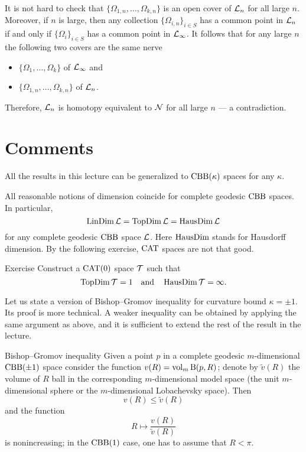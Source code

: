 It is not hard to check that $\{\Omega_{1,n},\dots,\Omega_{k,n}\}$ is an open cover of $\mathcal{L}_n$ for all large $n$.
Moreover, if $n$ is large, then any collection $\{\Omega_{i,n}\}_{i\in S}$ has a common point in $\mathcal{L}_n$ 
if and only if $\{\Omega_{i}\}_{i\in S}$ has a common point in $\mathcal{L}_\infty$.
It follows that for any large $n$ the following two covers are the same nerve
\begin{itemize}
\item $\{\Omega_{1},\dots,\Omega_{k}\}$ of $\mathcal{L}_\infty$ and 
\item $\{\Omega_{1,n},\dots,\Omega_{k,n}\}$ of $\mathcal{L}_n$.
\end{itemize}
Therefore, $\mathcal{L}_n$ is homotopy equivalent to $\mathcal{N}$ for all large $n$ --- a contradiction.
\qeds


\section{Comments}

All the results in this lecture can be generalized to $\mathrm{CBB}(\kappa)$ spaces for any $\kappa$.

All reasonable notions of dimension coincide for complete geodesic $\mathrm{CBB}$ spaces.
In particular,
\[\mathop{\rm LinDim}\nolimits \mathcal{L}=\mathop{\rm TopDim}\nolimits \mathcal{L}=\mathop{\rm HausDim}\nolimits \mathcal{L}\]
for any complete geodesic $\mathrm{CBB}$ space $\mathcal{L}$.
Here $\mathop{\rm HausDim}\nolimits$ stands for Hausdorff dimension.
By the following exercise, $\mathrm{CAT}$ spaces are not that good.

\begin{thm}{Exercise}
Construct a $\mathrm{CAT}(0)$ space $\mathcal{T}$ such that 
\[\mathop{\rm TopDim}\nolimits \mathcal{T}=1
\quad\text{and}\quad
\mathop{\rm HausDim}\nolimits \mathcal{T}=\infty.
\]

\end{thm}

Let us state a version of Bishop--Gromov inequality for curvature bound $\kappa=\pm1$.
Its proof is more technical.
A weaker inequality can be obtained by applying the same argument as above,
and it is sufficient to extend the rest of the result in the lecture.

\begin{thm}{Bishop--Gromov inequality}
Given a point $p$ in a complete geodesic $m$-dimensional $\mathrm{CBB}(\pm1)$ space consider the function $v(R)\z=\vol_m\oBall(p,R)$;
denote by $\tilde v(R)$ the volume of $R$ ball in the corresponding $m$-dimensional model space (the unit $m$-dimensional sphere or the $m$-dimensional Lobachevsky space).
Then 
\[v(R)\le \tilde v(R)\]
and the function 
\[R\mapsto \frac{v(R)}{\tilde v(R)}\] is nonincreasing;
in the $\mathrm{CBB}(1)$ case, one has to assume that $R<\pi$.
\end{thm}

